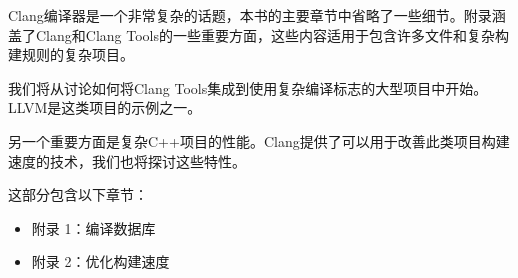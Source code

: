 Clang编译器是一个非常复杂的话题，本书的主要章节中省略了一些细节。附录涵盖了Clang和Clang Tools的一些重要方面，这些内容适用于包含许多文件和复杂构建规则的复杂项目。

我们将从讨论如何将Clang Tools集成到使用复杂编译标志的大型项目中开始。LLVM是这类项目的示例之一。

另一个重要方面是复杂C++项目的性能。Clang提供了可以用于改善此类项目构建速度的技术，我们也将探讨这些特性。

这部分包含以下章节：

\begin{itemize}
\item
附录 1：编译数据库

\item
附录 2：优化构建速度
\end{itemize}